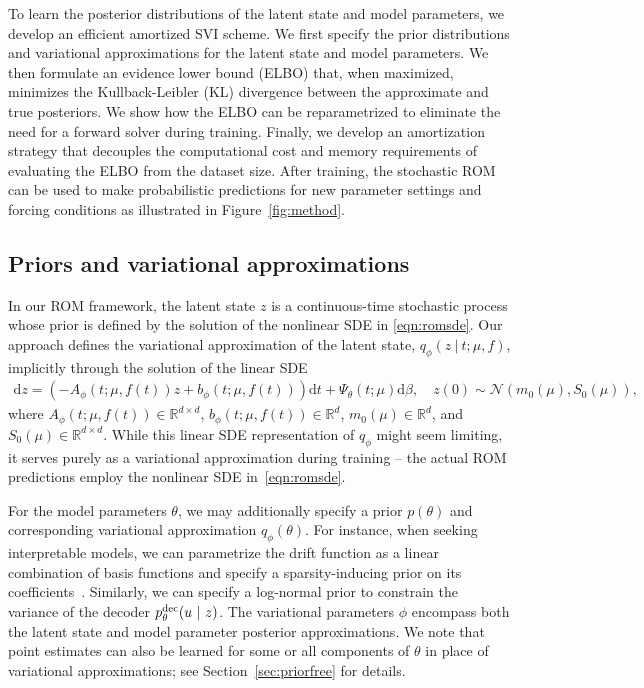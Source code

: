 \documentclass{article}
\begin{document}
	To learn the posterior distributions of the latent state and model parameters, we develop an efficient amortized SVI scheme. We first specify the prior distributions and variational approximations for the latent state and model parameters. We then formulate an evidence lower bound (ELBO) that, when maximized, minimizes the Kullback-Leibler (KL) divergence between the approximate and true posteriors. We show how the ELBO can be reparametrized to eliminate the need for a forward solver during training. Finally, we develop an amortization strategy that decouples the computational cost and memory requirements of evaluating the ELBO from the dataset size. After training, the stochastic ROM can be used to make probabilistic predictions for new parameter settings and forcing conditions as illustrated in Figure~\ref{fig:method}.
	
	\subsection{Priors and variational approximations} \label{sec:prior}
	
	In our ROM framework, the latent state $z$ is a continuous-time stochastic process whose prior is defined by the solution of the nonlinear SDE in \eqref{eqn:romsde}. Our approach defines the variational approximation of the latent state, $q_{\phi}(z \ |\ t; \mu, f)$, implicitly through the solution of the linear SDE
	\begin{equation} \label{eqn:mgp}
		\begin{aligned}
			\text{d}z = \left(-A_{\phi}(t; \mu, f(t)) z + b_{\phi}(t; \mu, f(t))\right)\text{d}t + \Psi_{\theta}(t; \mu) \text{d}\beta,\quad z(0) \sim \mathcal{N}(m_0(\mu), S_0(\mu)),
		\end{aligned}
	\end{equation}
	where $A_{\phi}(t; \mu, f(t)) \in \mathbb{R}^{d \times d}$, $b_{\phi} (t;\mu, f(t)) \in \mathbb{R}^d$, $m_0(\mu) \in \mathbb{R}^d$, and $S_0(\mu) \in \mathbb{R}^{d\times d}$. While this linear SDE representation of $q_\phi$ might seem limiting, it serves purely as a variational approximation during training -- the actual ROM predictions employ the nonlinear SDE in~\eqref{eqn:romsde}.
	
	For the model parameters $\theta$, we may additionally specify a prior $p(\theta)$ and corresponding variational approximation $q_\phi(\theta)$. For instance, when seeking interpretable models, we can parametrize the drift function as a linear combination of basis functions and specify a sparsity-inducing prior on its coefficients~\cite{Course_2023_State_Estimation}. Similarly, we can specify a log-normal prior to constrain the variance of the decoder $p^{\rm dec}_{\theta}(u\ |\ z)$. The variational parameters $\phi$ encompass both the latent state and model parameter posterior approximations. We note that point estimates can also be learned for some or all components of $\theta$ in place of variational approximations; see Section~\ref{sec:priorfree} for details.
	
\end{document}
